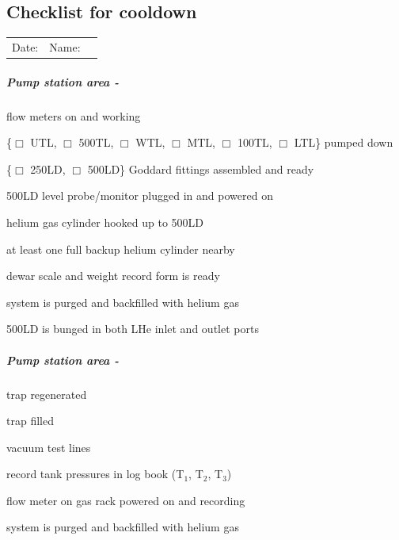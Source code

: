 \begin{appendices}
\noappendicestocpagenum
\addappheadtotoc
\chapter{Checklist for cooldown}
\label{appendix:checklist-for-cooldown}


\begin{tabular}{ l r c }
  Date: \underline{\hspace{4cm}} & Name: \underline{\hspace{4cm}}
\end{tabular}

\paragraph{Pump station area - \hef}

\begin{checklist}
 \item flow meters on and working
 \item \{$\Box$ UTL, $\Box$ 500TL, $\Box$ WTL, $\Box$ MTL, $\Box$ 100TL, $\Box$ LTL\} pumped down
 \item \{$\Box$ 250LD, $\Box$ 500LD\} Goddard fittings assembled and ready
 \item 500LD level probe/monitor plugged in and powered on
 \item helium gas cylinder hooked up to 500LD
 \item at least one full backup helium cylinder nearby
 \item dewar scale and weight record form is ready
 \item system is purged and backfilled with helium gas
 \item 500LD is bunged in both LHe inlet and outlet ports
 
\end{checklist}

\paragraph{Pump station area - \het}
\begin{checklist}
 \item \lnn{} trap regenerated
 \item \lnn{} trap filled
 \item vacuum test \het{} lines
 \item record \het{} tank pressures in log book (T$_1$, T$_2$, T$_3$)
 \item flow meter on \het{} gas rack powered on and recording
 \item system is purged and backfilled with helium gas 
\end{checklist}


\end{appendices}
